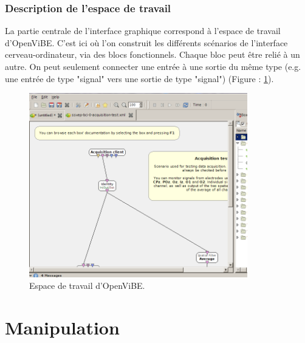 \subsubsection*{Description de l'espace de travail}

La partie centrale de l'interface graphique correspond à l'espace de travail d'OpenViBE. C'est ici où l'on construit les différents scénarios de l'interface cerveau-ordinateur, via des blocs fonctionnels. Chaque bloc peut être relié à un autre. On peut seulement connecter une entrée à une sortie du même type (e.g. une entrée de type "signal" vers une sortie de type "signal") (Figure : \ref{fig:interface_travail_ov_1}).

\begin{figure}[h]
	\centering\includegraphics[height=8cm]{images/interface_travail_ov.png}
	\caption{Espace de travail d'OpenViBE.}
	\label{fig:interface_travail_ov_1}
\end{figure}


\newpage
\section*{Manipulation}

